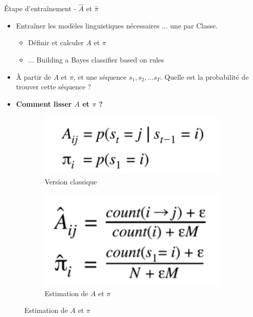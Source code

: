 \documentclass[aspectratio=169,xcolor=dvipsnames, t]{beamer}
\begin{document}
\begin{frame}{Étape d'entraînement - $\hat{A}$ et $\hat{\pi}$}
	\begin{itemize}
		\item Entraîner les modèles linguistiques nécessaires ... une par Classe.
		\begin{itemize}
			\item Définir et calculer $A$ et $\pi$ 
			\item ... Building a Bayes classifier based on rules
		\end{itemize}
		\item À partir de $A$ et $\pi$, et une séquence ${s_1,s_2,...s_T}$. Quelle est la probabilité de trouver cette séquence ?
		
		\item \textbf{Comment lisser  $A$ et $\pi$ ?}
	\end{itemize}

	\begin{figure}
		\centering
		\begin{subfigure}{.5\textwidth}
			\centering
			\includegraphics[width=0.78\linewidth]{figures/eq1AnPi.png}
			\caption{Version classique}
		\end{subfigure}%
		\begin{subfigure}{.5\textwidth}
			\centering
				\includegraphics[width=0.48\paperheight]{figures/eq1AnPiEst.png}
			\caption{Estimation de $A$ et $\pi$}
		\end{subfigure}
	\end{figure}
	
\end{frame}
\end{document}
